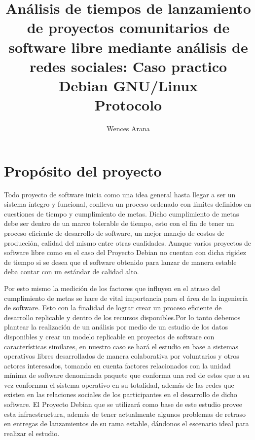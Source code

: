 \documentclass[12pt]{report}
\begin{document}
  \title{ {Análisis  de  tiempos  de  lanzamiento  de
proyectos comunitarios  de software  libre mediante análisis  de redes
sociales:   Caso   practico    Debian   GNU/Linux}
\\   {Protocolo}   }
\author{Wences Arana}
\maketitle

\tableofcontents
\chapter*{Propósito del proyecto}

Todo proyecto de software inicia como  una idea general hasta llegar a
ser un sistema  íntegro y funcional, conlleva un  proceso ordenado con
límites definidos  en cuestiones  de tiempo  y cumplimiento  de metas.
Dicho cumplimiento de  metas debe ser dentro de un  marco tolerable de
tiempo, esto con el fin de tener un proceso eficiente de desarrollo de
software, un mejor  manejo de costos de producción,  calidad del mismo
entre otras cualidades. Aunque varios proyectos de software libre como
en el caso del Proyecto Debian  no cuentan con dicha rigidez de tiempo
si se  desea que el  software obtenido  para lanzar de  manera estable
deba contar con un estándar de calidad alto.

Por esto mismo  la medición de los factores que  influyen en el atraso
del cumplimiento de metas se hace de vital importancia para el área de
la ingeniería  de software. Esto con  la finalidad de lograr  crear un
proceso eficiente  de desarrollo replicable  y dentro de  los recursos
disponibles.Por  lo  tanto  debemos  plantear  la  realización  de  un
análisis por medio  de un estudio de los datos  disponibles y crear un
modelo  replicable  en  proyectos   de  software  con  características
similares,  en nuestro  caso se  hará el  estudio en  base a  sistemas
operativos libres desarrollados de manera colaborativa por voluntarios
y otros  actores interesados, tomando en  cuenta factores relacionados
con la unidad  mínima de software denominada paquete  que conforma una
red  de estos  que  a su  vez  conforman el  sistema  operativo en  su
totalidad, además de las redes  que existen en las relaciones sociales
de los participantes  en el desarrollo de dicho  software. El Proyecto
Debian  que  se  utilizará  como  base de  este  estudio  provee  esta
infraestructura,  además de  tener  actualmente  algunos problemas  de
retraso en  entregas de lanzamientos  de su rama estable,  dándonos el
escenario ideal para realizar el estudio.
\end{document}
